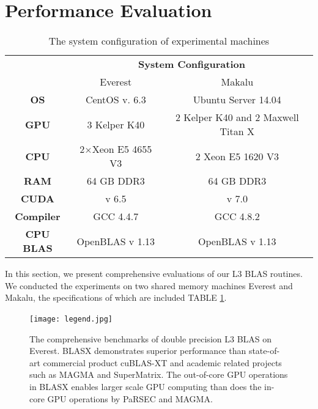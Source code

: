 \documentclass[conference]{IEEEtran}
\begin{document}
\section{Performance Evaluation}
\begin{table}[!t]
\caption{The system configuration of experimental machines}
\label{Machines}
\centering
\begin{tabular}{c c c}
    \toprule
    &\multicolumn{2}{c}{\textbf{System Configuration}}\\
    \cline{2-3}
                 &      Everest            &      Makalu              \\  \midrule
    \textbf{OS}  &      CentOS v. 6.3     &      Ubuntu Server 14.04                \\
    \textbf{GPU} &      3 Kelper K40      &      2 Kelper K40 and 2 Maxwell Titan X \\
    \textbf{CPU} &      2$\times$Xeon E5 4655 V3 &      2 Xeon E5 1620 V3                  \\
    \textbf{RAM} &      64 GB DDR3        &      64 GB DDR3                         \\ 
    \textbf{CUDA}&      v 6.5             &      v 7.0                              \\
    \textbf{Compiler}   &      GCC 4.4.7         &      GCC 4.8.2                          \\
    \textbf{CPU BLAS}   &      OpenBLAS v 1.13   &      OpenBLAS v 1.13                    \\
    \bottomrule
\end{tabular}
\vspace{-0.12in}
\end{table}

In this section, we present comprehensive evaluations of our L3 BLAS routines.
We conducted the experiments on two shared memory machines Everest and Makalu, the specifications 
of which are included TABLE \ref{Machines}.

\clearpage
\begin{figure*}[t]
\centering
\texttt{[image: legend.jpg]}
\mbox{
}
\hfil
\mbox{
}
\hfil
\mbox{
}
\caption{The comprehensive benchmarks of double precision L3 BLAS on Everest. BLASX
demonstrates superior performance than state-of-art commercial product cuBLAS-XT and academic 
related projects such as MAGMA and SuperMatrix. The out-of-core GPU operations in BLASX enables 
larger scale GPU computing than does the in-core GPU operations by PaRSEC and MAGMA. }
\label{benchmark}
\end{figure*}
\clearpage
\end{document}
